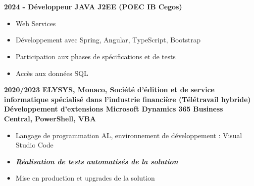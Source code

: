 \documentclass[10pt,a4paper]{article}
\newcommand{\myvspace}{\vspace{0.3cm}}
\begin{document}
\begin{minipage}[t]{0.65\textwidth}
    \vspace{10pt}
    \hspace{0.7cm}
    \myvspace
    \section*{}

    \textbf{2024 - Développeur JAVA J2EE (POEC IB Cegos) }
    \begin{itemize}[nosep, leftmargin=*, itemsep=0pt, parsep=0pt]
            \item Web Services 
            \item Développement avec Spring, Angular, TypeScript, Bootstrap 
            \item Participation aux phases de spécifications et de tests 
            \item Accès aux données SQL
    \end{itemize}
    \myvspace
    \textbf{2020/2023 ELYSYS, Monaco, Société d’édition et de service
    informatique spécialisé dans l’industrie financière (Télétravail hybride)
    Développement d’extensions Microsoft Dynamics 365 Business Central,
    PowerShell, VBA}
    \begin{itemize}[nosep, leftmargin=*, itemsep=0pt, parsep=0pt]
    \item Langage de programmation AL, environnement de développement : Visual Studio
    Code
    \item \textbf{\textit{Réalisation de tests automatisés de la solution}}
    \item Mise en production et upgrades de la solution
    \end{itemize}
    \myvspace
    

\end{minipage}
\end{document}
